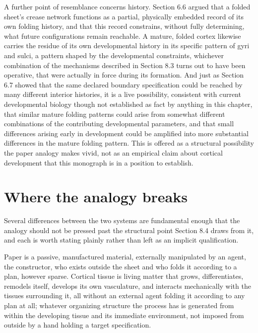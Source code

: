 \documentclass[11pt,oneside]{book}
\begin{document}
A further point of resemblance concerns history. Section 6.6 argued that
a folded sheet's crease network functions as a partial, physically
embedded record of its own folding history, and that this record
constrains, without fully determining, what future configurations remain
reachable. A mature, folded cortex likewise carries the residue of its
own developmental history in its specific pattern of gyri and sulci, a
pattern shaped by the developmental constraints, whichever combination
of the mechanisms described in Section 8.3 turns out to have been
operative, that were actually in force during its formation. And just as
Section 6.7 showed that the same declared boundary specification could
be reached by many different interior histories, it is a live
possibility, consistent with current developmental biology though not
established as fact by anything in this chapter, that similar mature
folding patterns could arise from somewhat different combinations of the
contributing developmental parameters, and that small differences
arising early in development could be amplified into more substantial
differences in the mature folding pattern. This is offered as a
structural possibility the paper analogy makes vivid, not as an
empirical claim about cortical development that this monograph is in a
position to establish.

\hypertarget{where-the-analogy-breaks}{%
\section{Where the analogy breaks}\label{where-the-analogy-breaks}}

Several differences between the two systems are fundamental enough that
the analogy should not be pressed past the structural point Section 8.4
draws from it, and each is worth stating plainly rather than left as an
implicit qualification.

Paper is a passive, manufactured material, externally manipulated by an
agent, the constructor, who exists outside the sheet and who folds it
according to a plan, however sparse. Cortical tissue is living matter
that grows, differentiates, remodels itself, develops its own
vasculature, and interacts mechanically with the tissues surrounding it,
all without an external agent folding it according to any plan at all;
whatever organizing structure the process has is generated from within
the developing tissue and its immediate environment, not imposed from
outside by a hand holding a target specification.
\end{document}
